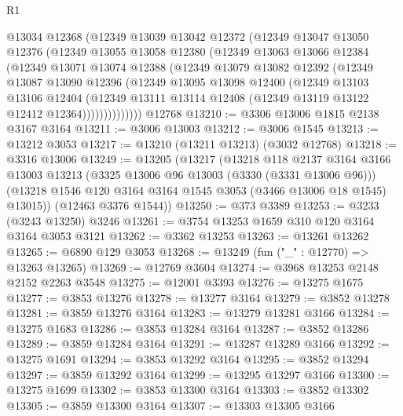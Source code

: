 \begin{lexlean}{R1}
\begin{coremodule}
          @13034
          @12368
          (@12349
            @13039
            @13042
            @12372
            (@12349
              @13047
              @13050
              @12376
              (@12349
                @13055
                @13058
                @12380
                (@12349
                  @13063
                  @13066
                  @12384
                  (@12349
                    @13071
                    @13074
                    @12388
                    (@12349
                      @13079
                      @13082
                      @12392
                      (@12349
                        @13087
                        @13090
                        @12396
                        (@12349
                          @13095
                          @13098
                          @12400
                          (@12349
                            @13103
                            @13106
                            @12404
                            (@12349
                              @13111
                              @13114
                              @12408
                              (@12349 @13119 @13122 @12412 @12364))))))))))))))
    @12768
@13210 := @3306 @13006 @1815 @2138 @3167 @3164
@13211 := @3006 @13003
@13212 := @3006 @1545
@13213 := @13212 @3053
@13217 := @13210 (@13211 @13213) (@3032 @12768)
@13218 := @3316 @13006
@13249 := @13205
    (@13217
      (@13218
        @118
        @2137
        @3164
        @3166
        @13003
        @13213
        (@3325 @13006 @96 @13003 (@3330 (@3331 @13006 @96)))
        (@13218 @1546 @120 @3164 @3164 @1545 @3053 (@3466 @13006 @18 @1545) @13015))
      (@12463 @3376 @1544))
@13250 := @373 @3389
@13253 := @3233 (@3243 @13250) @3246
@13261 := @3754 @13253 @1659 @310 @120 @3164 @3164 @3053 @3121
@13262 := @3362 @13253
@13263 := @13261 @13262
@13265 := @6890 @129 @3053
@13268 := @13249 (fun ("_" : @12770) => @13263 @13265)
@13269 := @12769 @3604
@13274 := @3968 @13253 @2148 @2152 @2263 @3548
@13275 := @12001 @3393
@13276 := @13275 @1675
@13277 := @3853 @13276
@13278 := @13277 @3164
@13279 := @3852 @13278
@13281 := @3859 @13276 @3164
@13283 := @13279 @13281 @3166
@13284 := @13275 @1683
@13286 := @3853 @13284 @3164
@13287 := @3852 @13286
@13289 := @3859 @13284 @3164
@13291 := @13287 @13289 @3166
@13292 := @13275 @1691
@13294 := @3853 @13292 @3164
@13295 := @3852 @13294
@13297 := @3859 @13292 @3164
@13299 := @13295 @13297 @3166
@13300 := @13275 @1699
@13302 := @3853 @13300 @3164
@13303 := @3852 @13302
@13305 := @3859 @13300 @3164
@13307 := @13303 @13305 @3166

\end{coremodule}
\end{lexlean}

